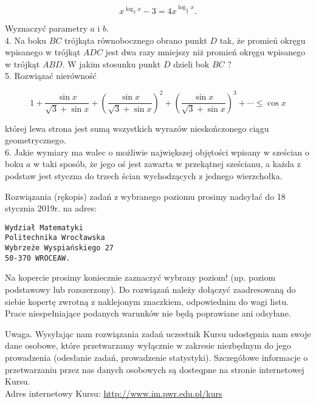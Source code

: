 \documentclass[10pt]{article}
\begin{document}
$$
x^{\log _{2} x}-3=4 x^{\log _{\frac{1}{2}} x} .
$$

Wyznaczyć parametry $a$ i $b$.\\
4. Na boku $B C$ trójkąta równobocznego obrano punkt $D$ tak, że promień okręgu wpisanego w trójkąt $A D C$ jest dwa razy mniejszy niż promień okręgu wpisanego w trójkąt $A B D$. W jakim stosunku punkt $D$ dzieli bok $B C$ ?\\
5. Rozwiązać nierówność

$$
1+\frac{\sin x}{\sqrt{3}+\sin x}+\left(\frac{\sin x}{\sqrt{3}+\sin x}\right)^{2}+\left(\frac{\sin x}{\sqrt{3}+\sin x}\right)^{3}+\cdots \leqslant \cos x
$$

której lewa strona jest sumą wszystkich wyrazów nieskończonego ciągu geometrycznego.\\
6. Jakie wymiary ma walec o możliwie największej objętości wpisany w sześcian o boku $a$ w taki sposób, że jego oś jest zawarta w przekątnej sześcianu, a każda z podstaw jest styczna do trzech ścian wychodzących z jednego wierzchołka.

Rozwiązania (rękopis) zadań z wybranego poziomu prosimy nadsyłać do 18 stycznia 2019r. na adres:

\begin{verbatim}
Wydział Matematyki
Politechnika Wrocławska
Wybrzeże Wyspiańskiego 27
50-370 WROCEAW.
\end{verbatim}

Na kopercie prosimy koniecznie zaznaczyć wybrany poziom! (np. poziom podstawowy lub rozszerzony). Do rozwiązań należy dołączyć zaadresowaną do siebie kopertę zwrotną z naklejonym znaczkiem, odpowiednim do wagi listu. Prace niespełniające podanych warunków nie będą poprawiane ani odsyłane.

Uwaga. Wysyłając nam rozwiązania zadań uczestnik Kursu udostępnia nam swoje dane osobowe, które przetwarzamy wyłącznie w zakresie niezbędnym do jego prowadzenia (odesłanie zadań, prowadzenie statystyki). Szczegółowe informacje o przetwarzaniu przez nas danych osobowych są dosteqpne na stronie internetowej Kursu.\\
Adres internetowy Kursu: \href{http://www.im.pwr.edu.pl/kurs}{http://www.im.pwr.edu.pl/kurs}
\end{document}
